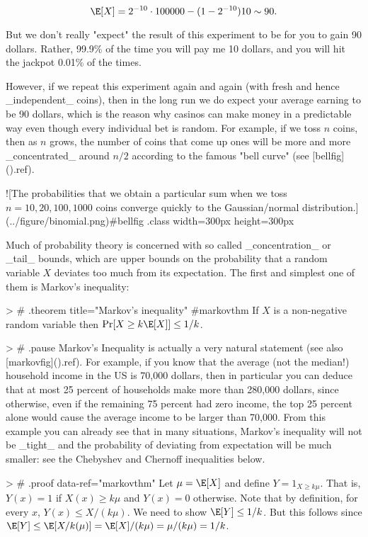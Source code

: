$$
\E[X] = 2^{-10}\cdot 100000 - (1-2^{-10})10 \sim 90 .
$$

But we don't really "expect" the result of this experiment to be for you to gain 90 dollars.
Rather, 99.9\% of the time you will pay me 10 dollars, and you will hit the jackpot 0.01\% of the times.

However, if we repeat this experiment again and again (with fresh and hence _independent_ coins), then in the long run we do expect your average earning to be 90 dollars, which is the reason why casinos can make money in a predictable way even though every individual bet is random.
For example, if we toss $n$ coins, then as $n$ grows, the number of coins that come up ones will be more and more _concentrated_ around $n/2$ according to  the famous "bell curve" (see [bellfig](){.ref}).

![The probabilities that we obtain a particular sum when we toss $n=10,20,100,1000$ coins converge quickly to the Gaussian/normal distribution.](../figure/binomial.png){#bellfig .class width=300px height=300px}

Much of probability theory is concerned with so called _concentration_ or _tail_ bounds, which are upper bounds on the probability that a random variable $X$ deviates too much from its expectation.
The first and simplest one of them is Markov's inequality:

> # {.theorem title="Markov's inequality" #markovthm}
If $X$ is a non-negative random variable then $\Pr[ X \geq k \E[X] ] \leq 1/k$.

> # { .pause }
Markov's Inequality is actually a very natural statement (see also [markovfig](){.ref}). For example, if you know that the average (not the median!) household income in the US is 70,000 dollars, then in particular you can deduce that at most 25 percent of households make more than 280,000 dollars, since otherwise, even if the remaining 75 percent  had zero income, the top 25 percent alone would cause the average income to be larger than 70,000. From this example you can already see that in many situations, Markov's inequality will not be _tight_ and the probability of deviating from expectation will be much smaller: see the Chebyshev and Chernoff inequalities below.

> # {.proof data-ref="markovthm"}
Let $\mu = \E[X]$ and define $Y=1_{X \geq k \mu}$. That is, $Y(x)=1$ if $X(x) \geq k \mu$ and $Y(x)=0$ otherwise.
Note that by definition, for every $x$, $Y(x) \leq X/(k\mu)$.
We need to show $\E[Y] \leq 1/k$.
But this follows since  $\E[Y] \leq \E[X/k(\mu)] = \E[X]/(k\mu) = \mu/(k\mu)=1/k$.

